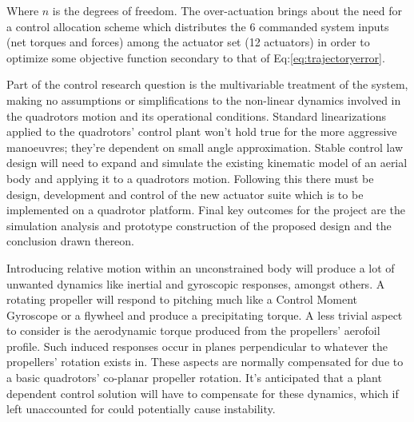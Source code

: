 Where $n$ is the degrees of freedom. The over-actuation brings about the need for a control allocation scheme which distributes the 6 commanded system inputs (net torques and forces) among the actuator set (12 actuators) in order to optimize some objective function secondary to that of Eq:\ref{eq:trajectoryerror}.
\par
Part of the control research question is the multivariable treatment of the system, making no assumptions or simplifications to the non-linear dynamics involved in the quadrotors motion and its operational conditions. Standard linearizations applied to the quadrotors' control plant won't hold true for the more aggressive manoeuvres; they're dependent on small angle approximation. Stable control law design will need to expand and simulate the existing kinematic model of an aerial body and applying it to a quadrotors motion. Following this there must be design, development and control of the new actuator suite which is to be implemented on a quadrotor platform. Final key outcomes for the project are the simulation analysis and prototype construction of the proposed design and the conclusion drawn thereon.
\par
Introducing relative motion within an unconstrained body will produce a lot of unwanted dynamics like inertial and gyroscopic responses, amongst others. A rotating propeller will respond to pitching much like a Control Moment Gyroscope \cite{cmg} or a flywheel and produce a precipitating torque. A less trivial aspect to consider is the aerodynamic torque produced from the propellers' aerofoil profile. Such induced responses occur in planes perpendicular to whatever the propellers' rotation exists in. These aspects are normally compensated for due to a basic quadrotors' co-planar propeller rotation. It's anticipated that a plant dependent control solution will have to compensate for these dynamics, which if left unaccounted for could potentially cause instability.
